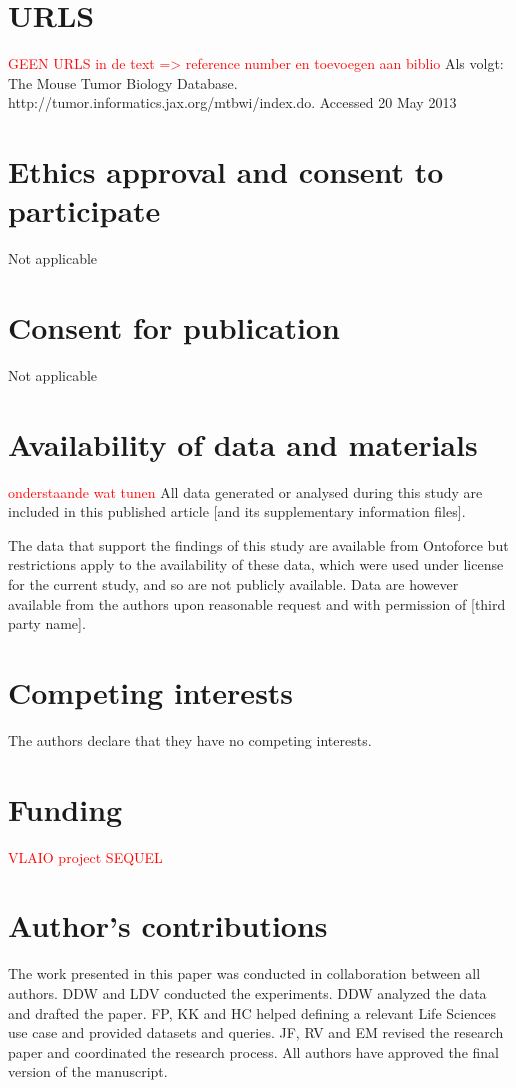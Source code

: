 \documentclass[twocolumn]{bmcart}%
\newcommand\todo[1]{\textcolor{red}{#1}}
\begin{document}
\begin{backmatter}

\section*{URLS}
\todo{GEEN URLS in de text => reference number en toevoegen aan biblio}
Als volgt: The Mouse Tumor Biology Database. http://tumor.informatics.jax.org/mtbwi/index.do. Accessed 20 May 2013

\section*{Ethics approval and consent to participate}
Not applicable

\section*{Consent for publication}
Not applicable

\section*{Availability of data and materials}

\todo{onderstaande wat tunen}
All data generated or analysed during this study are included in this published article [and its supplementary information files].

The data that support the findings of this study are available from Ontoforce but restrictions apply to the availability of these data, which were used under license for the current study, and so are not publicly available. Data are however available from the authors upon reasonable request and with permission of [third party name].

\section*{Competing interests}
The authors declare that they have no competing interests.

\section*{Funding}
\todo{VLAIO project SEQUEL}

\section*{Author's contributions}
The work presented in this paper was conducted in collaboration between all authors. DDW and
LDV conducted the experiments. DDW analyzed the data and drafted the paper. FP, KK and HC helped defining a relevant Life Sciences use case and provided datasets and queries. JF, RV and EM revised the research paper and coordinated the research process. All authors have approved the final version of the manuscript. 


\end{backmatter}
\end{document}
